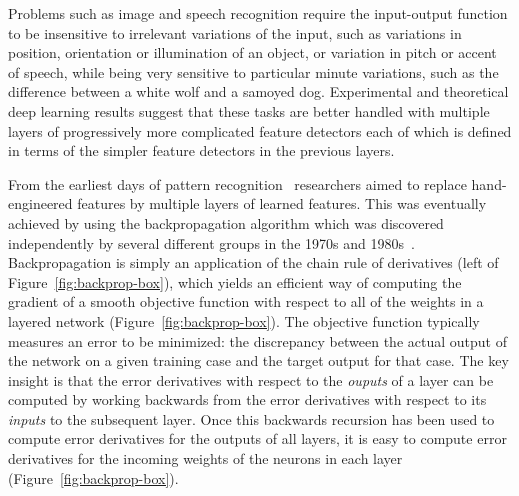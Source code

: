 \documentclass[10pts]{article}
\begin{document}
Problems such as image and speech recognition require the input-output
function to be insensitive to irrelevant variations of the input, such as
variations in position, orientation or illumination of an object, or
variation in pitch or accent of speech, while being very sensitive to
particular minute variations, such as the difference between a white wolf
and a samoyed dog. Experimental and theoretical deep learning results 
suggest that these tasks are better handled with multiple layers of
progressively more complicated feature detectors each of which is defined
in terms of the simpler feature detectors in the previous layers.

From the earliest days of pattern recognition~\citep{selfridge,Rosenblatt57}
researchers aimed to replace hand-engineered features by multiple layers of
learned features.  This was eventually achieved by using the
backpropagation algorithm which was discovered independently by several
different groups in the 1970s and 1980s~\citep{Werbos74,Parker85,LeCun85,RHW}.  
Backpropagation is simply an application of
the chain rule of derivatives (left of Figure~\ref{fig:backprop-box}),
which yields an efficient way of computing the gradient of a
smooth objective function with respect to all of the weights 
in  a layered network (Figure~\ref{fig:backprop-box}). 
The objective function typically measures an error to be minimized: 
the discrepancy between
the actual output of the network on a given training case and the target
output for that case.  The key insight is that the error derivatives with
respect to the {\it ouputs} of a layer can be computed by working
backwards from the error derivatives with respect to its {\em inputs}
to the subsequent layer.
Once this backwards recursion has been used to compute
error derivatives for the outputs of all layers, it is easy to compute
error derivatives for the incoming weights of the neurons in each layer 
(Figure~\ref{fig:backprop-box}).
\end{document}
